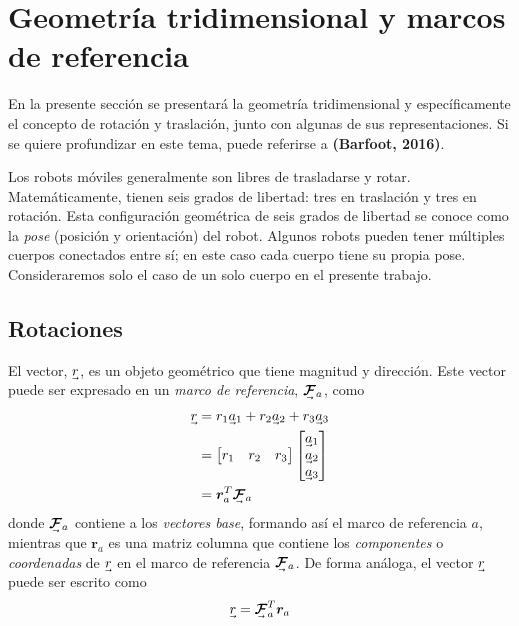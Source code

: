\section{Geometría tridimensional y marcos de referencia}
En la presente sección se presentará la geometría tridimensional y específicamente el concepto de rotación y traslación, junto con algunas de sus representaciones. Si se quiere profundizar en este tema, puede referirse a \textbf{(Barfoot, 2016)}.

Los robots móviles generalmente son libres de trasladarse y rotar. Matemáticamente, tienen seis grados de libertad: tres en traslación y tres en rotación. Esta configuración geométrica de seis grados de libertad se conoce como la \textit{pose} (posición y orientación) del robot. Algunos robots pueden tener múltiples cuerpos conectados entre sí; en este caso cada cuerpo tiene su propia pose. Consideraremos solo el caso de un solo cuerpo en el presente trabajo.

\subsection{Rotaciones}
El vector, $\undervec{r}$, es un objeto geométrico que tiene magnitud y dirección. Este vector puede ser expresado en un \textit{marco de referencia}, $\undervec{\bm{\mathcal{F}}}_a$, como
\begin{align}
    \undervec{r} &= r_1\undervec{a}_1+ r_2\undervec{a}_2 + r_3\undervec{a}_3 \\
    &= 
    \begin{bmatrix}
    r_1 & r_2 & r_3
    \end{bmatrix}
    \begin{bmatrix}
    \undervec{a}_1 \\ 
    \undervec{a}_2 \\
    \undervec{a}_3
    \end{bmatrix}
    \\
    &= \bm{r}_a^T\undervec{\bm{\mathcal{F}}}_a
\end{align}
donde $\undervec{\bm{\mathcal{F}}}_a$ contiene a los \textit{vectores base}, formando así el marco de referencia $a$, mientras que $\bm{r}_a$ es una matriz columna que contiene los \textit{componentes} o \textit{coordenadas} de $\undervec{r}$ en el marco de referencia $\undervec{\bm{\mathcal{F}}}_a$. De forma análoga, el vector $\undervec{r}$ puede ser escrito como
\begin{equation}
    \undervec{r} = \undervec{\bm{\mathcal{F}}}_a^T \bm{r}_a
\end{equation}

